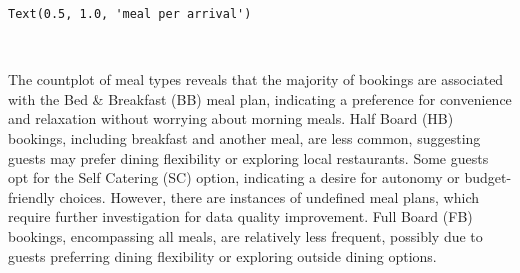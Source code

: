 \documentclass[11pt]{article}
\makeatletter
\newcommand{\boxspacing}{\kern\kvtcb@left@rule\kern\kvtcb@boxsep}
\newcommand{\prompt}[4]{
        {\ttfamily\llap{{\color{#2}[#3]:\hspace{3pt}#4}}\vspace{-\baselineskip}}
    }
\makeatother
\begin{document}
            \begin{tcolorbox}[breakable, size=fbox, boxrule=.5pt, pad at break*=1mm, opacityfill=0]
\prompt{Out}{outcolor}{33}{\boxspacing}
\begin{Verbatim}[commandchars=\\\{\}]
Text(0.5, 1.0, 'meal per arrival')
\end{Verbatim}
\end{tcolorbox}
        
    \begin{center}
    \end{center}
    { \hspace*{\fill} \\}
    
    The countplot of meal types reveals that the majority of bookings are
associated with the Bed \& Breakfast (BB) meal plan, indicating a
preference for convenience and relaxation without worrying about morning
meals. Half Board (HB) bookings, including breakfast and another meal,
are less common, suggesting guests may prefer dining flexibility or
exploring local restaurants. Some guests opt for the Self Catering (SC)
option, indicating a desire for autonomy or budget-friendly choices.
However, there are instances of undefined meal plans, which require
further investigation for data quality improvement. Full Board (FB)
bookings, encompassing all meals, are relatively less frequent, possibly
due to guests preferring dining flexibility or exploring outside dining
options.
\end{document}
